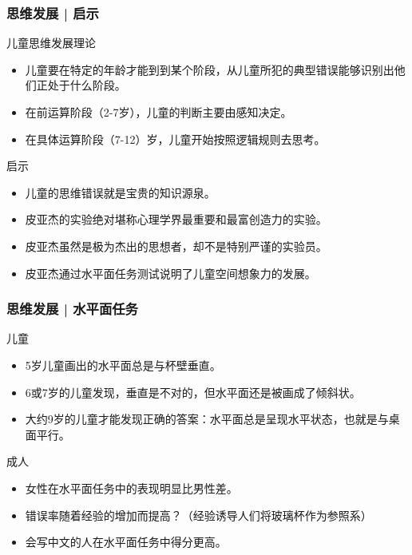 \begin{frame}
  \frametitle{思维发展 | 启示}
  \begin{block}{儿童思维发展理论}
    \begin{itemize}
      \item 儿童要在特定的年龄才能到到某个阶段，从儿童所犯的典型错误能够识别出他们正处于什么阶段。
      \item 在前运算阶段（2-7岁），儿童的判断主要由感知决定。
      \item 在具体运算阶段（7-12）岁，儿童开始按照逻辑规则去思考。
    \end{itemize}
  \end{block}
  \pause
  \begin{block}{启示}
    \begin{itemize}
      \item 儿童的思维错误就是宝贵的知识源泉。
      \item 皮亚杰的实验绝对堪称心理学界最重要和最富创造力的实验。
      \item 皮亚杰虽然是极为杰出的思想者，却不是特别严谨的实验员。
      \item 皮亚杰通过水平面任务测试说明了儿童空间想象力的发展。
    \end{itemize}
  \end{block}
\end{frame}

\begin{frame}
  \frametitle{思维发展 | 水平面任务}
  \begin{block}{儿童}
    \begin{itemize}
      \item 5岁儿童画出的水平面总是与杯壁垂直。
      \item 6或7岁的儿童发现，垂直是不对的，但水平面还是被画成了倾斜状。
      \item 大约9岁的儿童才能发现正确的答案：水平面总是呈现水平状态，也就是与桌面平行。
    \end{itemize}
  \end{block}
  \pause
  \begin{block}{成人}
    \begin{itemize}
      \item 女性在水平面任务中的表现明显比男性差。
      \item 错误率随着经验的增加而提高？（经验诱导人们将玻璃杯作为参照系）
      \item 会写中文的人在水平面任务中得分更高。
    \end{itemize}
  \end{block}
\end{frame}


